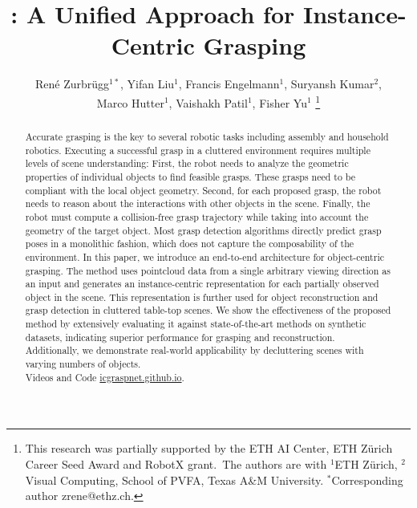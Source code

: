 \documentclass[letterpaper, 10 pt, conference]{ieeeconf}  %
\title{\LARGE \bf
\OurMethod: A Unified Approach for Instance-Centric Grasping
}
\author{René Zurbrügg$^{1*}$, Yifan Liu$^1$, Francis Engelmann$^1$, Suryansh Kumar$^2$,\\ Marco Hutter$^1$, Vaishakh Patil$^1$,  Fisher Yu$^1$%
\thanks{
\hspace{-20pt}
\begin{minipage}{1.0\columnwidth}
\vspace{-3pt}
This research was partially supported by the ETH AI Center, ETH Zürich Career Seed Award and RobotX grant.\ The authors are with $^1$ETH Zürich, $^2$Visual Computing, School of PVFA, Texas A\&M University. $^*$Corresponding author zrene@ethz.ch. 
\end{minipage}
}
}
\begin{document}
\maketitle
\thispagestyle{empty}
\pagestyle{empty}


\begin{abstract}
Accurate grasping is the key to several robotic tasks including assembly and household robotics.
Executing a successful grasp in a cluttered environment requires multiple levels of scene understanding:
First, the robot needs to analyze the geometric properties of individual objects to find feasible grasps.
These grasps need to be compliant with the local object geometry.
Second, for each proposed grasp, the robot needs to reason about the interactions with other objects in the scene.
Finally, the robot must compute a collision-free grasp trajectory while taking into account the geometry of the target object.
Most grasp detection algorithms directly predict grasp poses in a monolithic fashion, which does not capture the composability of the environment.
In this paper, we introduce an end-to-end architecture for object-centric grasping.
The method uses pointcloud data from a single arbitrary viewing direction as an input and generates an instance-centric representation for each partially observed object in the scene.
This representation is further used for object reconstruction and grasp detection in cluttered table-top scenes.
We show the effectiveness of the proposed method by extensively evaluating it against state-of-the-art methods on synthetic datasets, indicating superior performance for grasping and reconstruction.
Additionally, we demonstrate real-world applicability by decluttering scenes with varying numbers of objects. \\
Videos and Code \url{icgraspnet.github.io}.
\end{abstract}


\end{document}
